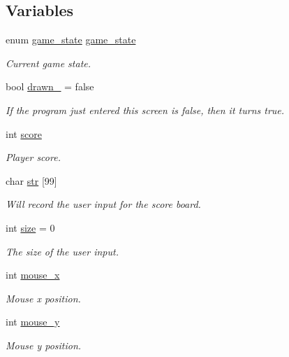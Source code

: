 \subsection*{Variables}
\begin{DoxyCompactItemize}
\item 
enum \hyperlink{group__utils_gad0ed1832dd134806ad335cdcc1a59ad2}{game\+\_\+state} \hyperlink{group__Game-Over-Menu_ga38caf7c28534bcd60ff95faf7fcae2d7}{game\+\_\+state}
\begin{DoxyCompactList}\small\item\em Current game state. \end{DoxyCompactList}\item 
bool \hyperlink{group__Game-Over-Menu_ga11932993f5f2c243a9c6e09519cf1b73}{drawn\+\_\+} = false
\begin{DoxyCompactList}\small\item\em If the program just entered this screen is false, then it turns true. \end{DoxyCompactList}\item 
int \hyperlink{group__Game-Over-Menu_gaef160b7437d94056f1dc59646cd5b87d}{score}
\begin{DoxyCompactList}\small\item\em Player score. \end{DoxyCompactList}\item 
char \hyperlink{group__Game-Over-Menu_gae3b2d5dad8a568a12752edcea2435e50}{str} \mbox{[}99\mbox{]}
\begin{DoxyCompactList}\small\item\em Will record the user input for the score board. \end{DoxyCompactList}\item 
int \hyperlink{group__Game-Over-Menu_ga439227feff9d7f55384e8780cfc2eb82}{size} = 0
\begin{DoxyCompactList}\small\item\em The size of the user input. \end{DoxyCompactList}\item 
int \hyperlink{group__Game-Over-Menu_ga6c59af730728bf5260ef828aea2eebee}{mouse\+\_\+x}
\begin{DoxyCompactList}\small\item\em Mouse x position. \end{DoxyCompactList}\item 
int \hyperlink{group__Game-Over-Menu_gab21653e455bbca86826aa5f628a5fdb2}{mouse\+\_\+y}
\begin{DoxyCompactList}\small\item\em Mouse y position. \end{DoxyCompactList}\item 

\end{DoxyCompactItemize}
